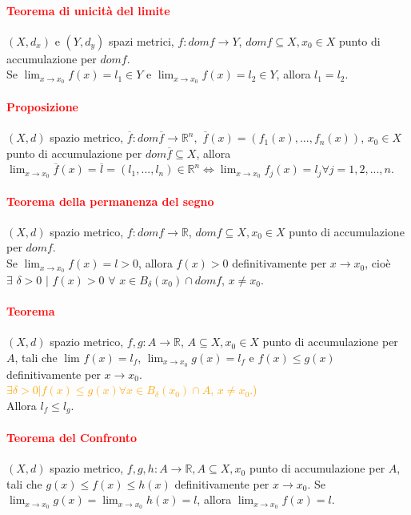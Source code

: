 \documentclass{article}
\newcommand{\R}{\mathbb{R}}
\begin{document}
\paragraph{\textcolor{red}{Teorema di unicità del limite}}
$(X,d_x)$ e $(Y,d_y)$ spazi metrici, $f: domf \rightarrow Y$, $domf \subseteq X, x_0 \in X$ punto di accumulazione per $domf$.\\
Se $\lim_{x \rightarrow x_0} f(x) = l_1 \in Y$ e $\lim_{x \rightarrow x_0} f(x) = l_2 \in Y$, allora $l_1=l_2$.

\paragraph{\textcolor{red}{Proposizione}}
$(X,d)$ spazio metrico, $\overline{f}: dom\overline{f} \rightarrow \R^n,\,\, \overline{f}(x)=(f_1(x),...,f_n(x))$, $x_0 \in X$ punto di accumulazione per $dom \overline{f} \subseteq X$, allora $\lim_{x \rightarrow x_0} \overline{f}(x)=\overline{l}=(l_1,...,l_n)\in \R^n \Leftrightarrow \lim_{x \rightarrow x_0} f_j(x)=l_j \forall j=1,2,...,n$.

\paragraph{\textcolor{red}{Teorema della permanenza del segno}}
$(X,d)$ spazio metrico, $f: domf \rightarrow\R$, $domf \subseteq X, x_0 \in X$ punto di accumulazione per $domf$.\\
Se $\lim_{x \rightarrow x_0} f(x) = l >0$, allora $f(x)>0$ definitivamente per $ x \rightarrow x_0$, cioè $\exists \,\, \delta >0 \,\, |\,\, f(x)>0 \,\, \forall \,\, x \in B_\delta (x_0)\cap domf$, $x \neq x_0$. 

\paragraph{\textcolor{red}{Teorema}}
$(X,d)$ spazio metrico, $f,g: A \rightarrow\R$, $A \subseteq X, x_0 \in X$ punto di accumulazione per $A$, tali che $\lim_{} f(x) =l_f$, $\lim_{x \rightarrow x_0} g(x)=l_f$ e $f(x)\leq g(x)$ definitivamente per $x \rightarrow x_0$. \\\textcolor{orange}{$\exists \delta > 0 | f(x) \leq g(x) \forall x \in B_\delta (x_0) \cap A$, $x \neq x_0$.)}\\ Allora $l_f \leq l_g$.

\paragraph{\textcolor{red}{Teorema del Confronto}}
$(X,d)$ spazio metrico, $f,g,h : A \rightarrow \R, A \subseteq X, x_0$ punto di accumulazione per $A$, tali che $g(x) \leq f(x)\leq h(x)$ definitivamente per $x \rightarrow x_0$. Se $\lim_{x \rightarrow x_0} g(x)=\lim_{x \rightarrow x_0} h(x)=l$, allora $\lim_{x \rightarrow x_0} f(x)=l$.
\end{document}
